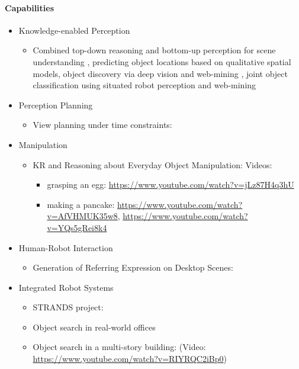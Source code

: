 \documentclass[runningheads,a4paper]{llncs}
\begin{document}
\paragraph{Capabilities}
\begin{itemize}
    \item Knowledge-enabled Perception
        \begin{itemize}
            \item Combined top-down reasoning and bottom-up perception for scene understanding \cite{kunze14topdown}, predicting object locations based on qualitative spatial models\cite{kunze14bootstrapping}, object discovery via deep vision and web-mining \cite{aloof@icra17}, joint object classification using situated robot perception and web-mining \cite{aloof@ecai16}
        \end{itemize}
    \item Perception Planning
        \begin{itemize}
            \item View planning under time constraints: \cite{kunze17ecmr}
        \end{itemize}
    \item Manipulation
        \begin{itemize}
            \item KR and Reasoning about Everyday Object Manipulation: \cite{kunze15aij} \newline Videos: 
                \begin{itemize}
                    \item grasping an egg: \url{https://www.youtube.com/watch?v=jLz87H4q3hU} 
                    \item making a pancake: \url{https://www.youtube.com/watch?v=AfVHMUK35w8}, \url{https://www.youtube.com/watch?v=YQs5gRei8k4}
                \end{itemize}
        \end{itemize}
    \item Human-Robot Interaction
        \begin{itemize}
            \item Generation of Referring Expression on Desktop Scenes: \cite{tufts17reg}
        \end{itemize}
    \item Integrated Robot Systems
        \begin{itemize}
            \item STRANDS project: \cite{strands@ram}
            \item Object search in real-world offices \cite{kunze14indirect}
            \item Object search in a multi-story building: \cite{kunze12objsearch} (Video: \url{https://www.youtube.com/watch?v=RIYRQC2iBp0})

        \end{itemize}
\end{itemize}
\end{document}
